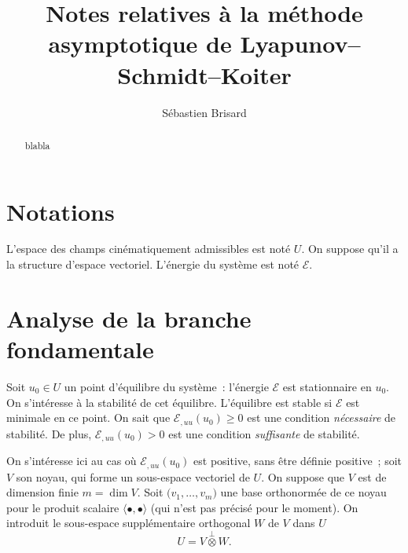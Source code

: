 \documentclass[12pt, final]{amsart}
\begin{document}
\title{Notes relatives à la méthode asymptotique de Lyapunov--Schmidt--Koiter}
\author{Sébastien Brisard}
\address{Navier, Ecole des Ponts, Univ Gustave Eiffel, IFSTTAR, CNRS, Marne-la-Vall\'ee, France}

\begin{abstract}
  blabla
\end{abstract}


\maketitle


\section{Notations}

L'espace des champs cinématiquement admissibles est noté \(U\). On suppose
qu'il a la structure d'espace vectoriel. L'énergie du système est noté \(\mathcal E\).

\section{Analyse de la branche fondamentale}

Soit \(u_0\in U\) un point d'équilibre du système~: l'énergie \(\mathcal E\) est
stationnaire en \(u_0\). On s'intéresse à la stabilité de cet
équilibre. L'équilibre est stable si \(\mathcal E\) est minimale en ce point. On sait
que \(\mathcal E_{,uu}(u_0)\geq0\) est une condition \emph{nécessaire} de stabilité. De
plus, \(\mathcal E_{,uu}(u_0)>0\) est une condition \emph{suffisante} de stabilité.

On s'intéresse ici au cas où \(\mathcal E_{,uu}(u_0)\) est positive, sans être définie
positive~; soit \(V\) son noyau, qui forme un sous-espace vectoriel de
\(U\). On suppose que \(V\) est de dimension finie \(m=\dim V\). Soit
\(\bigl(v_1, \ldots, v_m\bigr)\) une base orthonormée de ce noyau pour le produit
scalaire \(\langle \bullet ,\bullet \rangle \) (qui n'est pas précisé pour le moment). On introduit le
sous-espace supplémentaire orthogonal \(W\) de \(V\) dans \(U\)
\begin{equation}
  U=V\stackrel{\perp}{\otimes}W.
\end{equation}
\end{document}
